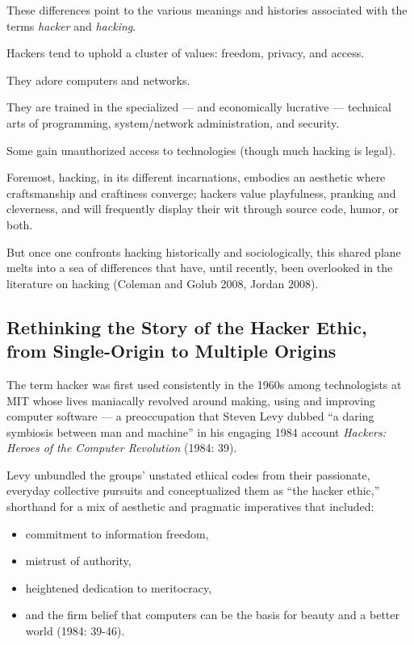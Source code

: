 \documentclass[letterpaper,12pt,english]{sphinxmanual}
\begin{document}
These
differences
point
to
the
various
meanings and
histories associated with the
terms
\emph{hacker}
and
\emph{hacking}.

Hackers
tend
to
uphold
a
cluster
of
values:
freedom,
privacy,
and
access.

They
adore
computers
and
networks.

They are
trained
in
the
specialized — and economically lucrative — technical arts of programming,
system/network
administration,
and
security.

Some
gain
unauthorized
access
to
technologies (though much hacking is legal).

Foremost, hacking,
in
its
different
incarnations,
embodies
an
aesthetic
where
craftsmanship
and
craftiness
converge; hackers value
playfulness,
pranking
and
cleverness,
and
will
frequently
display
their
wit
through
source
code,
humor,
or
both.

But once
one
confronts
hacking historically and sociologically,
this
shared
plane
melts
into
a
sea
of
differences
that
have, until recently,
been
overlooked
in
the
literature
on
hacking
(Coleman
and
Golub
2008,
Jordan
2008).


\subsection{Rethinking the Story of the Hacker Ethic, from Single-Origin to Multiple Origins}
\label{preface:rethinking-the-story-of-the-hacker-ethic-from-single-origin-to-multiple-origins}
The
term
hacker
was
first
used
consistently
in
the
1960s
among
technologists
at
MIT
whose
lives
maniacally
revolved
around
making,
using
and
improving
computer
software — a
preoccupation that
Steven
Levy
dubbed
“a daring symbiosis between man
and
machine” in his
engaging 1984 account
\emph{Hackers: Heroes of the Computer Revolution} (1984: 39).

Levy
unbundled
the
groups’
unstated
ethical
codes
from
their
passionate,
everyday
collective
pursuits
and
conceptualized
them
as “the
hacker
ethic,”
shorthand for a mix
of
aesthetic
and
pragmatic
imperatives that included:
\begin{itemize}
\item {} 
commitment to information freedom,

\item {} 
mistrust of authority,

\item {} 
heightened dedication to meritocracy,

\item {} 
and the firm belief that computers can be the basis for beauty and a better world (1984: 39-46).

\end{itemize}
\end{document}
